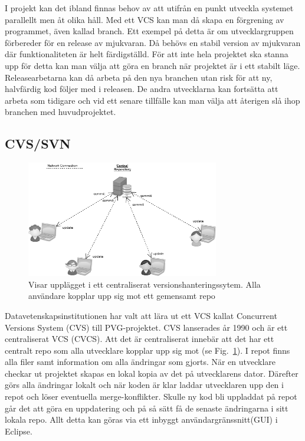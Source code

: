 I projekt kan det ibland finnas behov av att utifrån en punkt utveckla systemet parallellt men åt olika håll. Med ett VCS kan man då skapa en förgrening av programmet, även kallad branch. Ett exempel på detta är om utvecklargruppen förbereder för en release av mjukvaran. Då behövs en stabil version av mjukvaran där funktionaliteten är helt färdigställd. För att inte hela projektet ska stanna upp för detta kan man välja att göra en branch när projektet är i ett stabilt läge. Releasearbetarna kan då arbeta på den nya branchen utan risk för att ny, halvfärdig kod följer med i releasen. De andra utvecklarna kan fortsätta att arbeta som tidigare och vid ett senare tillfälle kan man välja att återigen slå ihop branchen med huvudprojektet.


\subsection{CVS/SVN}

\begin{figure}[htb!]\centering\includegraphics[width=0.75\textwidth]{CVCS.png}\caption{Visar upplägget i ett centraliserat versionshanteringssytem. Alla användare kopplar upp sig mot ett gemensamt repo}\label{fig:CVCSPic}\end{figure}



Datavetenskapsinstitutionen har valt att lära ut ett VCS kallat Concurrent Versions System (CVS) till PVG-projektet. CVS lanserades år 1990 och är ett centraliserat VCS (CVCS). Att det är centraliserat innebär att det har ett centralt repo som alla utvecklare kopplar upp sig mot (se Fig.~\ref{fig:CVCSPic}). I repot finns alla filer samt information om alla ändringar som gjorts. När en utvecklare checkar ut projektet skapas en lokal kopia av det på utvecklarens dator. Därefter görs alla ändringar lokalt och när koden är klar laddar utvecklaren upp den i repot och löser eventuella merge-konflikter. Skulle ny kod bli uppladdat på repot går det att göra en uppdatering och på så sätt få de senaste ändringarna i sitt lokala repo. Allt detta kan göras via ett inbyggt användargränssnitt(GUI) i Eclipse. 

